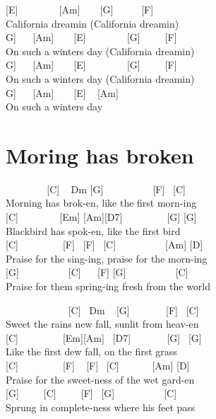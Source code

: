 \documentclass[
  letterpaper,
]{scrbook}
\begin{document}
{[}E{]} ~ ~ ~ ~ ~{[}Am{]} ~ ~ {[}G{]} ~ ~ ~ {[}F{]}\\
California dreamin (California dreamin\textquotesingle)\\
\hspace*{0.333em}{[}G{]} ~ ~{[}Am{]} ~ ~ {[}E{]} ~ ~ ~ ~ ~{[}G{]} ~ ~
~{[}F{]}\\
On such a winter\textquotesingle s day (California
dreamin\textquotesingle)\\
\hspace*{0.333em}{[}G{]} ~ ~{[}Am{]} ~ ~ {[}E{]} ~ ~ ~ ~ ~{[}G{]} ~ ~
~{[}F{]}\\
On such a winter\textquotesingle s day (California
dreamin\textquotesingle)\\
\hspace*{0.333em}{[}G{]} ~ ~{[}Am{]} ~ ~ {[}E{]} ~ {[}Am{]}\\
On such a winter\textquotesingle s day

\hypertarget{moring-has-broken}{%
\chapter{Moring has broken}\label{moring-has-broken}}

~ ~ ~ ~ ~ {[}C{]} ~ Dm {[}G{]} ~ ~ ~ ~ ~ ~{[}F{]} ~{[}C{]}\\
Morning has brok-en, like the first morn-ing\\
{[}C{]} ~ ~ ~ ~ ~{[}Em{]} {[}Am{]}{[}D7{]} ~ ~ ~ ~ ~ {[}G{]} {[}G{]}\\
Blackbird has spok-en, like the first bird\\
{[}C{]} ~ ~ ~ ~ ~ {[}F{]} ~{[}F{]} ~{[}C{]} ~ ~ ~ ~ ~ ~{[}Am{]}
{[}D{]}\\
Praise for the sing-ing, praise for the morn-ing\\
{[}G{]} ~ ~ ~ ~ ~ ~{[}C{]} ~ ~{[}F{]} {[}G{]} ~ ~ ~ ~ ~ ~{[}C{]}\\
Praise for them spring-ing fresh from the world

~ ~ ~ ~ ~ ~ ~ ~{[}C{]} ~Dm ~ {[}G{]} ~ ~ ~ ~ {[}F{]} ~{[}C{]}\\
Sweet the rain\textquotesingle s new fall, sunlit from heav-en\\
{[}C{]} ~ ~ ~ ~ ~ {[}Em{]}{[}Am{]} ~{[}D7{]} ~ ~ ~ ~ {[}G{]} ~{[}G{]}\\
Like the first dew fall, on the first grass\\
{[}C{]} ~ ~ ~ ~ ~ {[}F{]} ~ {[}F{]} ~{[}C{]} ~ ~ ~ ~{[}Am{]} {[}D{]}\\
Praise for the sweet-ness of the wet gard-en\\
{[}G{]} ~ ~ ~{[}C{]} ~ ~ ~{[}F{]} ~{[}G{]} ~ ~ ~ ~ ~ ~{[}C{]}\\
Sprung in complete-ness where his feet pass
\end{document}

